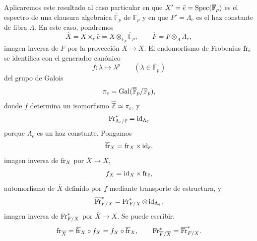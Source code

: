 Aplicaremos este resultado al caso particular en que $X'=\bar e=\operatorname{Spec}(\overline{\mathbb F}_p)$ es el espectro de una clausura algebraica $\overline{\mathbb F}_p$ de $\mathbb F_p$ y en que $F'=\Lambda_{\bar e}$ es el haz constante de fibra $\Lambda$. En este caso, pondremos
\[
\overline X=X\times_e\bar e=X\otimes_{\mathbb F_p}\overline{\mathbb F}_p,
\qquad
\overline F=F\otimes_\Lambda\Lambda_{\bar e},
\]
imagen inversa de $F$ por la proyección $\overline X\to X$. El endomorfismo de Frobenius $\operatorname{fr}_{\bar e}$ se identifica con el generador canónico
\[
f:\lambda\longmapsto\lambda^p\qquad(\lambda\in\overline{\mathbb F}_p)
\]
del grupo de Galois
\[
\pi_e=\operatorname{Gal}(\overline{\mathbb F}_p/\mathbb F_p),
\]
donde $f$ determina un isomorfismo $\widehat{\mathbb Z}\simeq\pi_e$, y
\[
\operatorname{Fr}^*_{\Lambda_{\bar e}/\bar e}=\operatorname{id}_{\Lambda_{\bar e}}
\]
porque $\Lambda_{\bar e}$ es un haz constante. Pongamos
\[
\overline{\operatorname{fr}}_X=\operatorname{fr}_X\times\operatorname{id}_{\bar e},
\]
imagen inversa de $\operatorname{fr}_X$ por $\overline X\to X$,
\[
f_X=\operatorname{id}_X\times\operatorname{fr}_{\bar e},
\]
automorfismo de $\overline X$ definido por $f$ mediante transporte de estructura, y
\[
\overline{\operatorname{Fr}}^*_{F/X}=\operatorname{Fr}^*_{F/X}\otimes\operatorname{id}_{\Lambda_{\bar e}},
\]
imagen inversa de $\operatorname{Fr}^*_{F/X}$ por $\overline X\to X$. Se puede escribir:
\[
\operatorname{fr}_{\overline X}=\overline{\operatorname{fr}}_X\circ f_X=f_X\circ\overline{\operatorname{fr}}_X,
\qquad
\operatorname{Fr}^*_{\overline F/\overline X}=\overline{\operatorname{Fr}}^*_{F/X}.
\]
